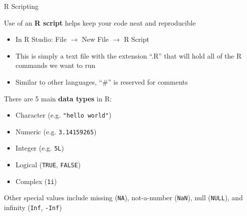 \documentclass[svgnames,smaller]{beamer}\usepackage[]{graphicx}\usepackage[]{color}
\begin{document}

\begin{frame}{R Scripting}

Use of an \textbf{R script} helps keep your code neat and reproducible
\begin{itemize}
    \item In R Studio: File $\rightarrow$ New File $\rightarrow$ R Script
    \item This is simply a text file with the extension ``.R'' that will hold all of the R commands we want to run
    \item Similar to other languages, ``\#'' is reserved for comments
\end{itemize}

There are 5 main \textbf{data types} in R:
\begin{itemize}
    \item Character (e.g. \texttt{"hello world"})
    \item Numeric (e.g. \texttt{3.14159265})
    \item Integer (e.g. \texttt{5L})
    \item Logical (\texttt{TRUE}, \texttt{FALSE})
    \item Complex (\texttt{1i})
\end{itemize}

Other special values include missing (\texttt{NA}), not-a-number (\texttt{NaN}), null (\texttt{NULL}), and infinity (\texttt{Inf}, \texttt{-Inf})

\end{frame}

\end{document}
